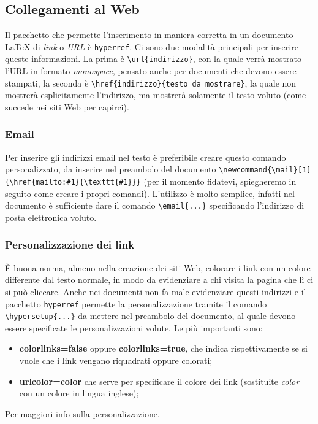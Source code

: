 \subsection{Collegamenti al Web}
Il pacchetto che permette l'inserimento in maniera corretta in un documento \LaTeX{} di \textit{link} o \textit{URL} è \verb!hyperref!. Ci sono due modalità principali per inserire queste informazioni. La prima è \verb!\url{indirizzo}!, con la quale verrà mostrato l'URL in formato \textit{monospace}, pensato anche per documenti che devono essere stampati, la seconda è \verb!\href{indirizzo}{testo_da_mostrare}!, la quale non mostrerà esplicitamente l'indirizzo, ma mostrerà solamente il testo voluto (come succede nei siti Web per capirci). 

\subsubsection{Email}
Per inserire gli indirizzi email nel testo è preferibile creare questo comando personalizzato, da inserire nel preambolo del documento \verb!\newcommand{\mail}[1]{\href{mailto:#1}{\texttt{#1}}}! (per il momento fidatevi, spiegheremo in seguito come creare i propri comandi). L'utilizzo è molto semplice, infatti nel documento è sufficiente dare il comando \verb!\email{...}! specificando l'indirizzo di posta elettronica voluto.

\subsubsection{Personalizzazione dei link}
È buona norma, almeno nella creazione dei siti Web, colorare i link con un colore differente dal testo normale, in modo da evidenziare a chi visita la pagina che lì ci si può cliccare. Anche nei documenti non fa male evidenziare questi indirizzi e il pacchetto \verb!hyperref! permette la personalizzazione tramite il comando \verb!\hypersetup{...}! da mettere nel preambolo del documento, al quale devono essere specificate le personalizzazioni volute. Le più importanti sono:
\begin{itemize}
    \item \textbf{colorlinks=false} oppure \textbf{colorlinks=true}, che indica rispettivamente se si vuole che i link vengano riquadrati oppure colorati;
    \item \textbf{urlcolor=color} che serve per specificare il colore dei link (sostituite \textit{color} con un colore in lingua inglese);
\end{itemize}
\href{https://en.wikibooks.org/wiki/LaTeX/Hyperlinks}{Per maggiori info sulla personalizzazione}.